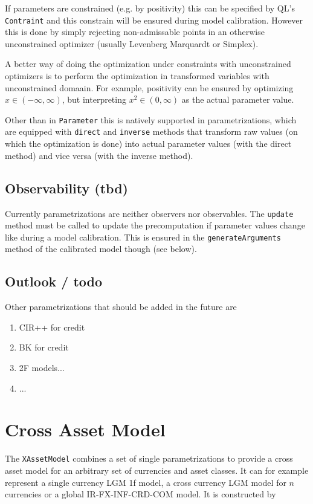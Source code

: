 \documentclass[12pt, a4paper]{article}
\begin{document}
If parameters are constrained (e.g. by positivity) this can be specified by QL's \verb+Contraint+ and this constrain will be ensured during model calibration. However this is done by simply rejecting non-admissable points in an otherwise unconstrained optimizer (usually Levenberg Marquardt or Simplex). 

A better way of doing the optimization under constraints with unconstrained optimizers is to perform the optimization in transformed variables with unconstrained domaain. For example, positivity can be ensured by optimizing $x\in(-\infty,\infty)$, but interpreting $x^2\in(0,\infty)$ as the actual parameter value.

Other than in \verb+Parameter+ this is natively supported in parametrizations, which are equipped with \verb+direct+ and \verb+inverse+ methods that transform raw values (on which the optimization is done) into actual parameter values (with the direct method) and vice versa (with the inverse method). 

\subsection{Observability (tbd)}

Currently parametrizations are neither observers nor observables. The \verb+update+ method must be called to update the precomputation if parameter values change like during a model calibration. This is ensured in the \verb+generateArguments+ method of the calibrated model though (see below).

\subsection{Outlook / todo}

Other parametrizations that should be added in the future are

\begin{enumerate}
\item CIR++ for credit
\item BK for credit 
\item 2F models...
\item ...
\end{enumerate}

\section{Cross Asset Model}

The \verb+XAssetModel+ combines a set of single parametrizations to provide a cross asset model for an arbitrary set of currencies and asset classes. It can for example represent a single currency LGM 1f model, a cross currency LGM model for $n$ currencies or a global IR-FX-INF-CRD-COM model. It is constructed by
\end{document}
